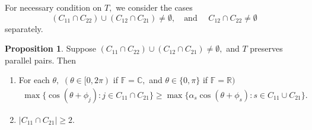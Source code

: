 \documentclass{amsart}
\theoremstyle{definition}
\newtheorem{prop}[theorem]{Proposition}
\theoremstyle{remark}
\numberwithin{equation}{section}
\begin{document}
For necessary condition on $T,$ we consider the cases 
\[(C_{11}\cap C_{22})\cup (C_{12}\cap C_{21})\neq \emptyset, \quad \text{and } \quad C_{12}\cap C_{22}\neq \emptyset \] separately. 
\begin{prop}\label{prop-nec}
	Suppose $(C_{11}\cap C_{22})\cup (C_{12}\cap C_{21})\neq \emptyset,$ and $T$ preserves parallel pairs. %
	Then 
\begin{enumerate}
\item For each $\theta,$ $(\theta\in [0,2\pi)$ if $\mathbb{F}=\mathbb{C},$ and $\theta\in \{0,\pi\}$ if $\mathbb{F}=\mathbb{R})$ 
\begin{equation}\label{eq-06}
	\begin{split}
\max\{\cos(\theta+\phi_j):j\in C_{11}\cap C_{21}\}
\geq  \max\Big\{\alpha_s\cos(\theta+\phi_s):s\in C_{11}\cup C_{21}\Big\}.	
\end{split}
\end{equation}	
\item $|C_{11}\cap C_{21}|\geq 2.$
\end{enumerate}
\end{prop}
\end{document}
